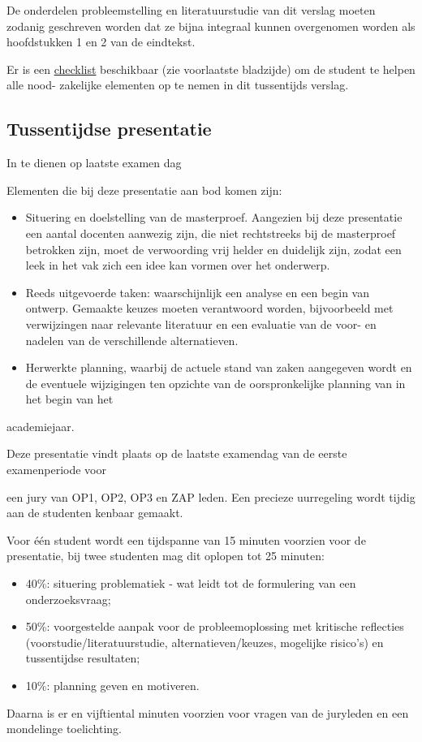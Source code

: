 \documentclass{article}
\begin{document}
De onderdelen probleemstelling en literatuurstudie van dit verslag moeten zodanig geschreven worden dat ze bijna integraal kunnen overgenomen worden als hoofdstukken 1 en 2 van de eindtekst.



Er is een \uline{checklist} beschikbaar (zie voorlaatste bladzijde) om de student te helpen alle nood- zakelijke elementen op te nemen in dit tussentijds verslag.



\subsection{Tussentijdse presentatie}

In te dienen op laatste examen dag



Elementen die bij deze presentatie aan bod komen zijn:

\begin{itemize}
\item Situering en doelstelling van de masterproef. Aangezien bij deze presentatie een aantal docenten aanwezig zijn, die niet rechtstreeks bij de masterproef betrokken zijn, moet de verwoording vrij helder en duidelijk zijn, zodat een leek in het vak zich een idee kan vormen over het onderwerp.
\item Reeds uitgevoerde taken: waarschijnlijk een analyse en een begin van ontwerp. Gemaakte keuzes moeten verantwoord worden, bijvoorbeeld met verwijzingen naar relevante literatuur en een evaluatie van de voor- en nadelen van de verschillende alternatieven.
\item Herwerkte planning, waarbij de actuele stand van zaken aangegeven wordt en de eventuele wijzigingen ten opzichte van de oorspronkelijke planning van in het begin van het
\end{itemize}
academiejaar.



Deze presentatie vindt plaats op de laatste examendag van de eerste examenperiode voor

een jury van OP1, OP2, OP3 en ZAP leden. Een precieze uurregeling wordt tijdig aan de studenten kenbaar gemaakt.

Voor één student wordt een tijdspanne van 15 minuten voorzien voor de presentatie, bij twee studenten mag dit oplopen tot 25 minuten:

\begin{itemize}
\item 40\%: situering problematiek - wat leidt tot de formulering van een onderzoeksvraag;
\item 50\%: voorgestelde aanpak voor de probleemoplossing met kritische reflecties (voorstudie/literatuurstudie, alternatieven/keuzes, mogelijke risico’s) en tussentijdse resultaten; 
\item 10\%: planning geven en motiveren.
\end{itemize}
Daarna is er en vijftiental minuten voorzien voor vragen van de juryleden en een mondelinge toelichting.
\end{document}

